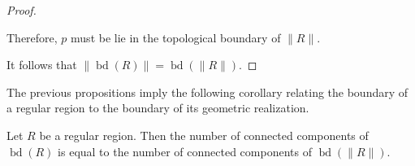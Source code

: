 \begin{proof}
\begin{enumerate}
    Therefore, $p$ must be lie in the topological boundary of $\lVert R \rVert$.
  \end{enumerate}
  It follows that $\lVert \operatorname{bd}(R) \rVert = \operatorname{bd} (\lVert R \rVert)$.
\end{proof}

The previous propositions imply the following corollary relating the boundary of a regular region to the boundary of its geometric realization.

\begin{corollary}\label{cor:real-components}
  Let $R$ be a regular region. Then the number of connected components of $\operatorname{bd}(R)$ is equal to the number of connected components of $\operatorname{bd}(\lVert R \rVert)$.
\end{corollary}